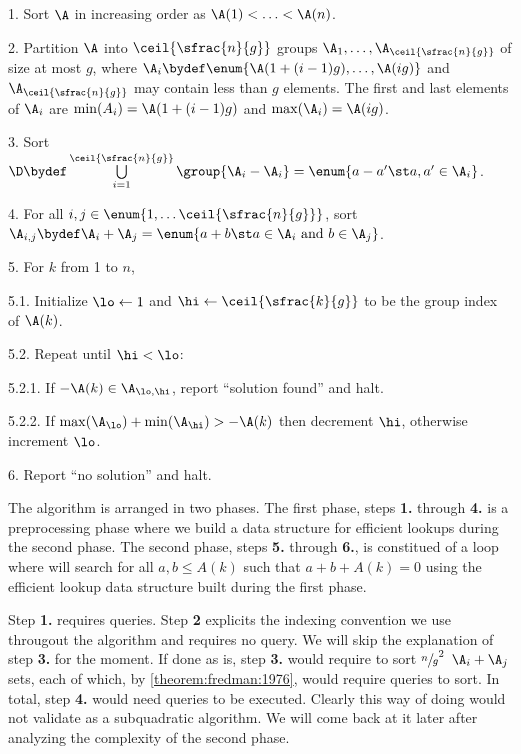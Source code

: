 \begin{algorithm}

\item[1.] Sort $\A$ in increasing order as $\A(1) < \ldots < \A(n)$.

\item[2.] Partition $\A$ into $\ceil{\sfrac{n}{g}}$ groups $\A_1, \ldots,
\A_{\ceil{\sfrac{n}{g}}}$ of size at most $g$, where $\A_i \bydef \enum{\A(1 + (i-1)g),
\ldots, \A(ig)}$ and $\A_{\ceil{\sfrac{n}{g}}}$ may contain less than $g$ elements.
The first and last elements of $\A_i$ are $\min(A_i) = \A(1 + (i-1)g)$ and
$\max(\A_i) = \A(ig)$.

\item[3.] Sort $\D \bydef \bigcup\limits_{i = 1}^{\ceil{\sfrac{n}{g}}}
\group{\A_i-\A_i} = \enum{a - a' \st a, a' \in \A_i}$.

\item[4.] For all $i,j \in \enum{1, \ldots \ceil{\sfrac{n}{g}}}$, sort $\A_{i,j}
\bydef \A_i + \A_j = \enum{a + b \st a \in \A_i \text{ and } b \in \A_j}$.

\item[5.] For $k$ from 1 to $n$,

\item[5.1.] Initialize $\lo \gets 1$ and $\hi \gets \ceil{\sfrac{k}{g}}$ to be
the group index of $\A(k)$.

\item[5.2.] Repeat until $\hi < \lo$:

\item[5.2.1.] If $-\A(k) \in \A_{\lo,\hi}$, report ``solution found'' and halt.

\item[5.2.2.] If $\max(\A_{\lo}) + \min(\A_{\hi}) > -\A(k)$ then decrement
$\hi$, otherwise increment $\lo$.

\item[6.] Report ``no solution'' and halt.

\end{algorithm}

The algorithm is arranged in two phases. The first phase, steps \textbf{1.}
through \textbf{4.} is a preprocessing phase where we build a data structure
for efficient lookups during the second phase. The second phase, steps
\textbf{5.} through \textbf{6.}, is constitued of a loop where will search for
all $a, b \le A(k)$ such that $a + b + A(k) = 0$ using the efficient lookup
data structure built during the first phase.

Step \textbf{1.} requires  queries. Step \textbf{2} explicits
the indexing convention we use througout the algorithm and requires no query.
We will skip the
explanation of step \textbf{3.} for the moment. If done as is, step
\textbf{3.} would require to sort $\sfrac{n}{g}^2$ $\A_i + \A_j$ sets, each of
which, by \ref{theorem:fredman:1976}, would require  queries to sort.
In total, step \textbf{4.} would need  queries to be executed.
Clearly this way of doing would not validate as a subquadratic algorithm. We
will come back at it later after analyzing the complexity of the second phase.

